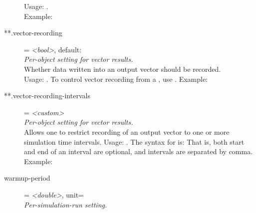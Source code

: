 \begin{description}
    Usage:
    .\\
    Example:
\item[**.vector-recording] = \textit{<bool>}, default: \\
    \textit{Per-object setting for vector results.}\\
    Whether data written into an output vector should be recorded.\\
    Usage:
    .
    To control vector recording from a , use
    . Example:
\item[**.vector-recording-intervals] = \textit{<custom>}\\
    \textit{Per-object setting for vector results.}\\
    Allows one to restrict recording of an output vector to one or more
    simulation time intervals. Usage:
    .
    The syntax for  is:
     That is,
    both start and end of an interval are optional, and intervals are separated
    by comma.\\
    Example:
\item[warmup-period] = \textit{<double>}, unit=\\
    \textit{Per-simulation-run setting.}\\

\end{description}
